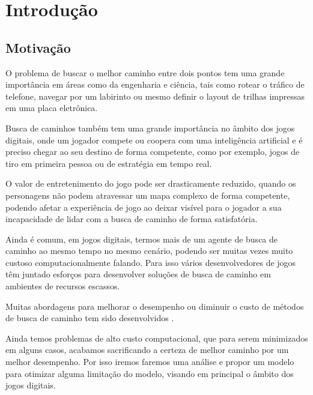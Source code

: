
\chapter[Introdução]{Introdução}

\section{Motivação}

O problema de buscar o melhor caminho entre dois pontos tem uma grande importância em áreas como da engenharia e ciência, tais como rotear o tráfico de telefone, navegar por um labirinto ou mesmo definir o layout de trilhas impressas em uma placa eletrônica.

Busca de caminhos também tem uma grande importância no âmbito dos jogos digitais, onde um jogador compete ou coopera com uma inteligência artificial e é preciso chegar ao seu destino de forma competente, como por exemplo, jogos de tiro em primeira pessoa ou de estratégia em tempo real.

O valor de entretenimento do jogo pode ser drasticamente reduzido, quando os personagens não podem atravessar um mapa complexo de forma competente, podendo afetar a experiência de jogo ao deixar visível para o jogador a sua incapacidade de lidar com a busca de caminho de forma satisfatória.

Ainda é comum, em jogos digitais, termos mais de um agente de busca de caminho ao mesmo tempo no mesmo cenário, podendo ser muitas vezes muito custoso computacionalmente falando. Para isso vários desenvolvedores de jogos têm juntado esforços para desenvolver soluções de busca de caminho em ambientes de recursos escassos.\cite{Pontevia}


Muitas abordagens para melhorar o desempenho ou diminuir o custo de métodos de busca de caminho tem sido desenvolvidos \cite{Ulysses}  \cite{Pollack} \cite{Timothy} \cite{WilliamMiller}. 

Ainda temos problemas de alto custo computacional, que para serem minimizados em alguns casos, acabamos sacrificando a certeza de melhor caminho por um melhor desempenho\cite{Botea}\cite{KORF199341}. Por isso iremos faremos uma análise e propor um modelo para otimizar alguma limitação do modelo, visando em principal o âmbito dos jogos digitais.

